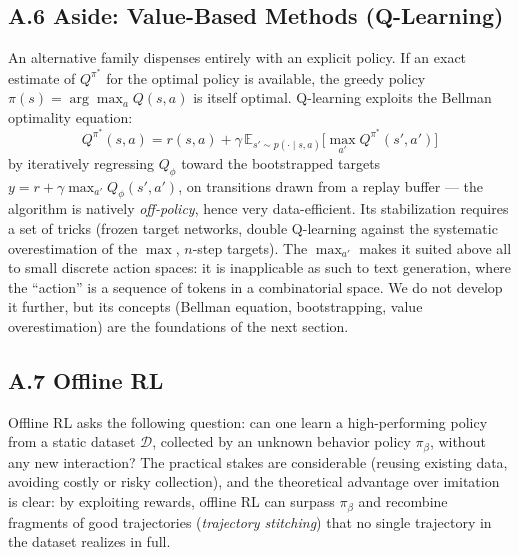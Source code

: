 \documentclass[11pt,a4paper]{article}
\begin{document}
\subsection*{A.6 Aside: Value-Based Methods (Q-Learning)}
An alternative family dispenses entirely with an explicit policy. If an exact estimate of $Q^{\pi^*}$ for the optimal policy is available, the greedy policy $\pi(s) = \arg\max_a Q(s, a)$ is itself optimal. Q-learning exploits the Bellman optimality equation:
\begin{equation}
Q^{\pi^*}(s, a) = r(s, a) + \gamma \, \mathbb{E}_{s' \sim p(\cdot \mid s, a)} \Big[ \max_{a'} Q^{\pi^*}(s', a') \Big]
\end{equation}
by iteratively regressing $Q_\phi$ toward the bootstrapped targets $y = r + \gamma \max_{a'} Q_\phi(s', a')$, on transitions drawn from a replay buffer — the algorithm is natively \emph{off-policy}, hence very data-efficient. Its stabilization requires a set of tricks (frozen target networks, double Q-learning against the systematic overestimation of the $\max$, $n$-step targets). The $\max_{a'}$ makes it suited above all to small discrete action spaces: it is inapplicable as such to text generation, where the ``action'' is a sequence of tokens in a combinatorial space. We do not develop it further, but its concepts (Bellman equation, bootstrapping, value overestimation) are the foundations of the next section.

\subsection*{A.7 Offline RL}
Offline RL asks the following question: can one learn a high-performing policy from a static dataset $\mathcal{D}$, collected by an unknown behavior policy $\pi_\beta$, without any new interaction? The practical stakes are considerable (reusing existing data, avoiding costly or risky collection), and the theoretical advantage over imitation is clear: by exploiting rewards, offline RL can surpass $\pi_\beta$ and recombine fragments of good trajectories (\emph{trajectory stitching}) that no single trajectory in the dataset realizes in full.
\end{document}
